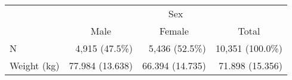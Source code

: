 \documentclass{article}
\begin{document}
\begin{table}[!h]
\centering
\begin{tabular}{llll}
\cline{1-4}
\multicolumn{1}{r}{} &
  \multicolumn{3}{c}{Sex} \\
\multicolumn{1}{r}{} &
  \multicolumn{1}{c}{Male} &
  \multicolumn{1}{c}{Female} &
  \multicolumn{1}{c}{Total} \\
\cline{1-4}
\multicolumn{1}{l}{N} &
  \multicolumn{1}{r}{4,915 (47.5\%)} &
  \multicolumn{1}{r}{5,436 (52.5\%)} &
  \multicolumn{1}{r}{10,351 (100.0\%)} \\
\multicolumn{1}{l}{Weight (kg)} &
  \multicolumn{1}{r}{77.984 (13.638)} &
  \multicolumn{1}{r}{66.394 (14.735)} &
  \multicolumn{1}{r}{71.898 (15.356)} \\
\cline{1-4}
\end{tabular}
\end{table}
\end{document}
